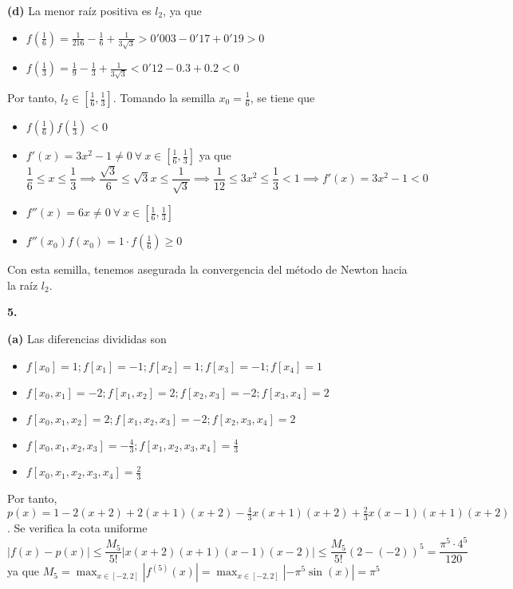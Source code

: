 \documentclass[12pt]{report}
\begin{document}
\vspace{2mm}
\textbf{(d)}
La menor raíz positiva es $l_2$, ya que 
\begin{itemize}
    \item $f(\frac{1}{6}) = \frac{1}{216} - \frac{1}{6} + \frac{1}{3\sqrt{3}} > 0'003 - 0'17 + 0'19 > 0$
    \item $f(\frac{1}{3}) = \frac{1}{9} - \frac{1}{3} + \frac{1}{3\sqrt{3}} < 0'12 -0.3+0.2 < 0$
\end{itemize}
Por tanto, $l_2 \in [\frac{1}{6},\frac{1}{3}]$. Tomando la semilla $x_0 = \frac{1}{6}$, se tiene que
\begin{itemize}
    \item $f(\frac{1}{6})f(\frac{1}{3}) < 0$
    \item $f'(x) = 3x^2 - 1 \neq 0 \ \forall \ x \in [\frac{1}{6},\frac{1}{3}]$ ya que 
    \[\frac{1}{6} \leq x \leq \frac{1}{3} \implies \frac{\sqrt{3}}{6} \leq \sqrt{3}x \leq \frac{1}{\sqrt{3}} \implies \frac{1}{12} \leq 3x^2 \leq \frac{1}{3} < 1 \implies f'(x) = 3x^2 - 1 < 0\]
    \item $f''(x) = 6x \neq 0 \ \forall \ x \in [\frac{1}{6},\frac{1}{3}]$
    \item $f''(x_0)f(x_0) = 1 \cdot f(\frac{1}{6}) \geq 0$
\end{itemize}
Con esta semilla, tenemos asegurada la convergencia del método de Newton hacia la raíz $l_2$.

\vspace{2mm}
\textbf{5. }

\vspace{2mm}
\textbf{(a)} Las diferencias divididas son
\begin{itemize}
    \item $f[x_0] = 1; f[x_1] = -1; f[x_2] = 1; f[x_3] = -1; f[x_4] = 1$
    \item $f[x_0,x_1] = -2; f[x_1,x_2] = 2; f[x_2,x_3] = -2; f[x_3,x_4] = 2$
    \item $f[x_0,x_1,x_2] = 2; f[x_1,x_2,x_3] = -2; f[x_2,x_3,x_4] = 2$
    \item $f[x_0,x_1,x_2,x_3] = -\frac{4}{3}; f[x_1,x_2,x_3,x_4] = \frac{4}{3}$
    \item $f[x_0,x_1,x_2,x_3,x_4] = \frac{2}{3}$
\end{itemize}
Por tanto,
$p(x) = 1 -2(x+2) +2(x+1)(x+2) -\frac{4}{3}x(x+1)(x+2) + \frac{2}{3}x(x-1)(x+1)(x+2)$. Se verifica la cota uniforme
\[|f(x) - p(x)| \leq \frac{M_5}{5!}|x(x+2)(x+1)(x-1)(x-2)| \leq \frac{M_5}{5!}(2-(-2))^5 = \frac{\pi^5 \cdot 4^5}{120}\]
ya que $\displaystyle M_5 = \max_{x \in [-2,2]} |f^{(5)}(x)| = \max_{x \in [-2,2]} |-\pi^5\sin(x)| = \pi^5$ 
\end{document}
